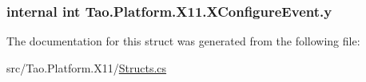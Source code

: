 \label{struct_tao_1_1_platform_1_1_x11_1_1_x_configure_event_acf377c89332e32c106409b5997079072}
\hypertarget{struct_tao_1_1_platform_1_1_x11_1_1_x_configure_event_a7d5e528c2da9578ca8af17cd44eb0234}{
\subsubsection[{y}]{\setlength{\rightskip}{0pt plus 5cm}internal int {\bf Tao.Platform.X11.XConfigureEvent.y}}}
\label{struct_tao_1_1_platform_1_1_x11_1_1_x_configure_event_a7d5e528c2da9578ca8af17cd44eb0234}


The documentation for this struct was generated from the following file:\begin{DoxyCompactItemize}
\item 
src/Tao.Platform.X11/\hyperlink{_structs_8cs}{Structs.cs}\end{DoxyCompactItemize}
